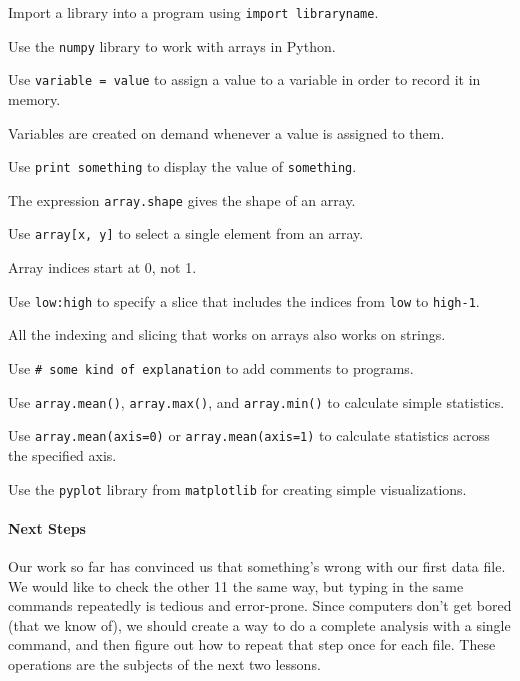 \documentclass{book}
\begin{document}
\begin{keypoints}
\begin{swcitemize}
\item
  Import a library into a program using \texttt{import libraryname}.
\item
  Use the \texttt{numpy} library to work with arrays in Python.
\item
  Use \texttt{variable = value} to assign a value to a variable in order
  to record it in memory.
\item
  Variables are created on demand whenever a value is assigned to them.
\item
  Use \texttt{print something} to display the value of
  \texttt{something}.
\item
  The expression \texttt{array.shape} gives the shape of an array.
\item
  Use \texttt{array{[}x, y{]}} to select a single element from an array.
\item
  Array indices start at 0, not 1.
\item
  Use \texttt{low:high} to specify a slice that includes the indices
  from \texttt{low} to \texttt{high-1}.
\item
  All the indexing and slicing that works on arrays also works on
  strings.
\item
  Use \texttt{\# some kind of explanation} to add comments to programs.
\item
  Use \texttt{array.mean()}, \texttt{array.max()}, and
  \texttt{array.min()} to calculate simple statistics.
\item
  Use \texttt{array.mean(axis=0)} or \texttt{array.mean(axis=1)} to
  calculate statistics across the specified axis.
\item
  Use the \texttt{pyplot} library from \texttt{matplotlib} for creating
  simple visualizations.
\end{swcitemize}
\end{keypoints}

\mbox{}\paragraph{Next Steps}

Our work so far has convinced us that something's wrong with our first
data file. We would like to check the other 11 the same way, but typing
in the same commands repeatedly is tedious and error-prone. Since
computers don't get bored (that we know of), we should create a way to
do a complete analysis with a single command, and then figure out how to
repeat that step once for each file. These operations are the subjects
of the next two lessons.
\end{document}
